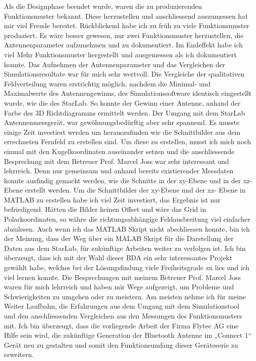 Als die Designphase beendet wurde, waren die zu produzierenden Funktionsmuster bekannt. Diese herzustellen und anschliessend auszumessen hat mir viel Freude bereitet. Rückblickend habe ich zu früh zu viele Funktionsmuster produziert. Es wäre besser gewesen, nur zwei Funktionsmuster herzustellen, die Antennenparameter aufzunehmen und zu dokumentiert. Im Endeffekt habe ich viel Mehr Funktionsmuster hergestellt und ausgemessen als ich dokumentiert konnte.
Das Aufnehmen der Antennenparameter und das Vergleichen der Simulationsresultate war für mich sehr wertvoll. Die Vergleiche der qualitativen Feldverteilung waren erstrichtig möglich, nachdem die Minimal- und Maximalwerte des Antennengewinns, des Simulationssoftware identisch eingestellt wurde, wie die des StarLab. So konnte der Gewinn einer Antenne, anhand der Farbe des 3D Richtdiagramms ermittelt werden. Der Umgang mit dem StarLab Antennenmessgerät, war gewöhnungsbedürftig aber sehr spannend. Es musste einige Zeit investiert werden um herauszufinden wie die Schnittbilder aus dem errechneten Fernfeld zu erstellen sind. Um diese zu erstellen, musst ich mich noch einmal mit den Kugelkoordinaten auseinander setzen und die anschliessende Besprechung mit dem Betreuer  Prof. Marcel Joss war sehr interessant und lehrreich. Denn nur gemeinsam und anhand bereits existierender Messdaten konnte ausfindig gemacht werden, wie die Schnitte in der xy-Ebene und in der xz- Ebene erstellt werden. Um die Schnittbilder der xy-Ebene und der xz- Ebene in MATLAB zu erstellen habe ich viel Zeit investiert, das Ergebnis ist nur befriedigend. Hätten die Bilder keinen Offset und wäre das Grid in Polarkoordinaten, so währe die richtungsabhängige Feldausbreitung viel einfacher abzulesen. Auch wenn ich das MATLAB Skript nicht abschliessen konnte, bin ich der Meinung, dass der Weg über ein MALAB Skript für die Darstellung der Daten aus dem StarLab, für zukünftige Arbeiten weiter zu verfolgen ist.  
Ich bin überzeugt, dass ich mit der Wahl dieser BDA ein sehr interessantes Projekt gewählt habe, welches bei der Lösungsfindung viele Freiheitsgrade zu lies und ich viel  lernen konnte. Die Besprechungen mit meinem Betreuer Prof. Marcel Joss waren für mich lehrreich und haben mir Wege aufgezeigt, um Probleme und Schwierigkeiten zu umgehen oder zu meistern. Am meisten nehme ich für meine Weiter Laufbahn, die Erfahrungen aus dem Umgang mit dem Simulationstool und den anschliessenden Vergleichen aus den Messungen des Funktionsmusters mit.
Ich bin überzeugt, dass die vorliegende Arbeit der Firma Flytec AG eine Hilfe sein wird, die zukünftige Generation der Bluetooth Antenne im „Connect 1“ Gerät neu zu gestalten und somit den Funktionsumfang dieser Geräteserie zu erweitern.

